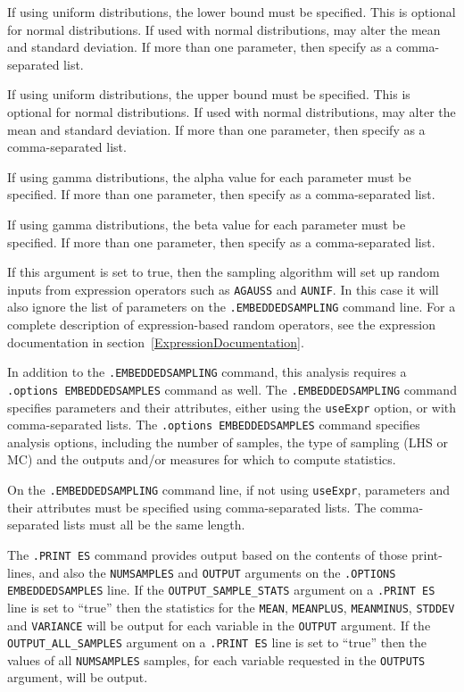 \begin{Command}
\begin{Arguments}
If using uniform distributions, the lower bound must be specified.
This is optional for normal distributions.  If used with normal
distributions, may alter the mean and standard deviation.
If more than one parameter, then specify as a comma-separated list.

If using uniform distributions, the upper bound must be specified.
This is optional for normal distributions.  If used with normal
distributions, may alter the mean and standard deviation.
If more than one parameter, then specify as a comma-separated list.

If using gamma distributions, the alpha value for each parameter
must be specified.  If more than one parameter, then specify as a
comma-separated list.

If using gamma distributions, the beta value for each parameter
must be specified.  If more than one parameter, then specify as a
comma-separated list.

If this argument is set to true, then the sampling algorithm will set up random 
  inputs from expression operators such as \verb|AGAUSS| and \verb|AUNIF|.  In 
  this case it will also ignore the list of parameters on the \verb|.EMBEDDEDSAMPLING| command line.
  For a complete description of expression-based random operators, see the expression
  documentation in section~\ref{ExpressionDocumentation}.

\end{Arguments}

\comments

In addition to the \verb|.EMBEDDEDSAMPLING| command, this analysis
requires a \verb|.options EMBEDDEDSAMPLES| command as well.  The
\verb|.EMBEDDEDSAMPLING| command specifies parameters and their
attributes, either using the \verb|useExpr| option, or with 
comma-separated lists.  The \verb|.options EMBEDDEDSAMPLES| command specifies
analysis options, including the number of samples, the type of
sampling (LHS or MC) 
and the outputs and/or measures for which to compute statistics.

On the \verb|.EMBEDDEDSAMPLING| command line, if not using \verb|useExpr|, 
parameters and their
attributes must be specified using comma-separated lists. The
comma-separated lists must all be the same length.

The \texttt{.PRINT ES} command provides output based on the contents
of those print-lines, and also the \texttt{NUMSAMPLES} and \texttt{OUTPUT}
arguments on the \texttt{.OPTIONS EMBEDDEDSAMPLES} line. If the
\texttt{OUTPUT\_SAMPLE\_STATS} argument on a \texttt{.PRINT ES} line is
set to ``true'' then the statistics for the \texttt{MEAN}, \texttt{MEANPLUS},
\texttt{MEANMINUS}, \texttt{STDDEV} and \texttt{VARIANCE} will be output for each
variable in the \texttt{OUTPUT} argument.  If the \texttt{OUTPUT\_ALL\_SAMPLES}
argument on a \texttt{.PRINT ES} line is set to ``true'' then the values
of all \texttt{NUMSAMPLES} samples, for each variable requested
in the \texttt{OUTPUTS} argument, will be output.

\end{Command}

